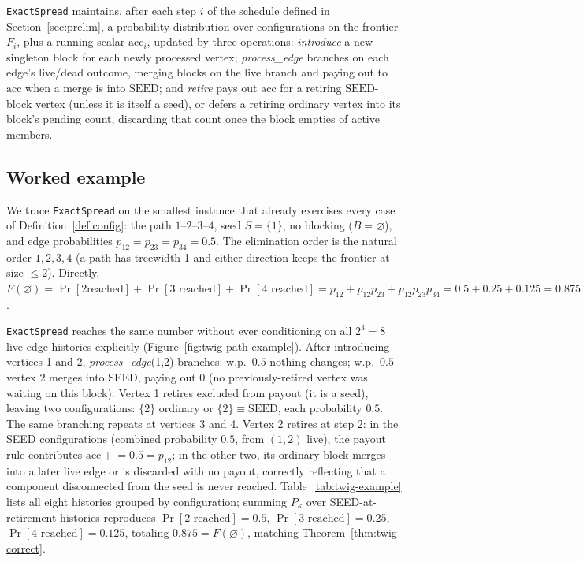 \documentclass[ijoc,sglanonrev]{informs4}
\begin{document}
\texttt{ExactSpread} maintains, after each step $i$ of the schedule defined
in Section~\ref{sec:prelim}, a probability distribution over configurations
on the frontier $F_i$, plus a running scalar $\mathrm{acc}_i$, updated by
three operations: \emph{introduce} a new singleton block for each newly
processed vertex; \emph{process\_edge} branches on each edge's live/dead
outcome, merging blocks on the live branch and paying out to $\mathrm{acc}$
when a merge is into $\mathrm{SEED}$; and \emph{retire} pays out $\mathrm{acc}$
for a retiring $\mathrm{SEED}$-block vertex (unless it is itself a seed), or
defers a retiring ordinary vertex into its block's pending count, discarding
that count once the block empties of active members.

\subsection{Worked example}\label{sec:twig-example}

We trace \texttt{ExactSpread} on the smallest instance that already
exercises every case of Definition~\ref{def:config}: the path
$1$--$2$--$3$--$4$, seed $S=\{1\}$, no blocking ($B=\varnothing$), and edge
probabilities $p_{12}=p_{23}=p_{34}=0.5$. The elimination order is the
natural order $1,2,3,4$ (a path has treewidth 1 and either direction keeps
the frontier at size $\le2$). Directly, $F(\varnothing)=\Pr[2\text{
reached}]+\Pr[3\text{ reached}]+\Pr[4\text{ reached}]
=p_{12}+p_{12}p_{23}+p_{12}p_{23}p_{34}=0.5+0.25+0.125=0.875$.

\texttt{ExactSpread} reaches the same number without ever conditioning on
all $2^3=8$ live-edge histories explicitly (Figure~\ref{fig:twig-path-example}).
After introducing vertices 1 and 2, \emph{process\_edge}(1,2) branches: w.p.\
$0.5$ nothing changes; w.p.\ $0.5$ vertex 2 merges into SEED, paying out
$0$ (no previously-retired vertex was waiting on this block). Vertex 1
retires excluded from payout (it is a seed), leaving two configurations:
$\{2\}$ ordinary or $\{2\}\equiv\mathrm{SEED}$, each probability $0.5$. The
same branching repeats at vertices 3 and 4. Vertex 2 retires at step 2: in
the SEED configurations (combined probability $0.5$, from $(1,2)$ live),
the payout rule contributes $\mathrm{acc}\mathrel{+}=0.5=p_{12}$; in the
other two, its ordinary block merges into a later live edge or is
discarded with no payout, correctly reflecting that a component
disconnected from the seed is never reached. Table~\ref{tab:twig-example}
lists all eight histories grouped by configuration; summing $P_\kappa$
over SEED-at-retirement histories reproduces
$\Pr[2\text{ reached}]=0.5$, $\Pr[3\text{ reached}]=0.25$,
$\Pr[4\text{ reached}]=0.125$, totaling $0.875=F(\varnothing)$, matching
Theorem~\ref{thm:twig-correct}.
\end{document}
